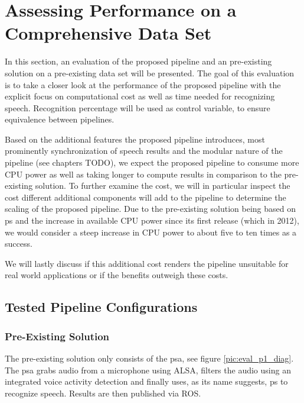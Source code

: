 

\section{Assessing Performance on a Comprehensive Data Set}
\label{eval:dataset}

In this section, an evaluation of the proposed pipeline and an pre-existing solution on a pre-existing data set will be presented.
The goal of this evaluation is to take a closer look at the performance of the proposed pipeline with the explicit focus on computational cost as well as time needed for recognizing speech.
Recognition percentage will be used as control variable, to ensure equivalence between pipelines.

Based on the additional features the proposed pipeline introduces, most prominently synchronization of speech results and the modular nature of the pipeline (see chapters TODO), we expect the proposed pipeline to consume more CPU power as well as taking longer to compute results in comparison to the pre-existing solution.
To further examine the cost, we will in particular inspect the cost different additional components will add to the pipeline to determine the scaling of the proposed pipeline.
Due to the pre-existing solution being based on \gls{ps} and the increase in available CPU power since its first release (which in 2012), we would consider a steep increase in CPU power to about five to ten times as a success.


We will lastly discuss if this additional cost renders the pipeline unsuitable for real world applications or if the benefits outweigh these costs.


\subsection{Tested Pipeline Configurations} %

\subsubsection{Pre-Existing Solution}

The pre-existing solution only consists of the \gls{psa}, see figure \ref{pic:eval_p1_diag}.
The \gls{psa} grabs audio from a microphone using ALSA, filters the audio using an integrated voice activity detection and finally uses, as its name suggests, \gls{ps} to recognize speech.
Results are then published via ROS.

